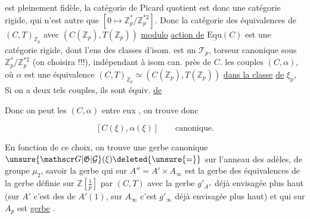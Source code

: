 est pleinement fidèle, la catégorie de Picard quotient est
donc une catégorie rigide, qui n'est autre que
$[0\mapsto\mathbb Z_p^*/\mathbb Z_p^{*2}]$. Donc la catégorie des équivalences de
$(C,T)_{\mathbb Z_p}$ avec $(C(\mathbb Z_p),T(\mathbb Z_p))$ \deleted{\unsure{$\to$}} \uline{modulo} \uline{action de} $\underline{\mathrm{Equ}}(C)$
est une catégorie rigide,  dont l'ens des
classes d'isom. est un $\mathcal T_p$, torseur canonique sous
$\mathbb Z_p^*/\mathbb Z_p^{*2}$ (on choisira !!!), indépendant à isom
can. près de $C$.  
 les
couples $(C,\alpha)$, où  $\alpha$ est une équivalence
$(C,T)_{\mathbb Z_p}\simeq(C(\mathbb Z_p),T(\mathbb Z_p))$ \uline{dans la classe} \uline{de} $\xi_p$, 
 Si on a deux tels couples, ils sont
 équiv. \uline{de} 


Donc on peut   les $(C,\alpha)$  entre
eux , on trouve donc

\[
[C(\xi),\alpha(\xi)]\qquad\text{canonique.}
\]


En fonction de ce choix, on trouve une gerbe
canonique $\unsure{\mathscr G|\mathfrak G|\mathcal G}(\xi)\deleted{\unsure{=}}$ sur l'anneau des adèles,
de groupe $\mu_2$, savoir la gerbe qui sur $A''=A'\times A_\infty$ est
la gerbe des équivalences  de la gerbe  
définie sur $\mathbb Z[\frac1p]$ par $(C,T)$  avec la gerbe
$g'_{A''}$ déjà envisagée plus haut (sur $A'$ c'est 
des \unsure{$\sqrt{\ }$} de $A'(1)$, sur $A_\infty$ c'est $g'_\infty$ déjà envisagée
plus haut) et qui sur $A_p$ est  \uline{gerbe} .

